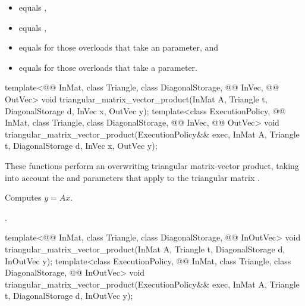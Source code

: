 \pnum
\expects
\begin{itemize}
\item
{} equals ,
\item
{} equals ,
\item
{} equals  for those overloads that take an  parameter, and
\item
{} equals  for those overloads that take a  parameter.
\end{itemize}

\begin{itemdecl}
template<@@ InMat, class Triangle, class DiagonalStorage, @@ InVec,
         @@ OutVec>
  void triangular_matrix_vector_product(InMat A, Triangle t, DiagonalStorage d, InVec x, OutVec y);
template<class ExecutionPolicy,
         @@ InMat, class Triangle, class DiagonalStorage, @@ InVec,
         @@ OutVec>
  void triangular_matrix_vector_product(ExecutionPolicy&& exec,
                                        InMat A, Triangle t, DiagonalStorage d, InVec x, OutVec y);
\end{itemdecl}

\begin{itemdescr}

\pnum
These functions perform
an overwriting triangular matrix-vector product,
taking into account the  and  parameters
that apply to the triangular matrix .

\pnum
\effects
Computes $y = A x$.

\pnum
\complexity
{}.
\end{itemdescr}

\begin{itemdecl}
template<@@ InMat, class Triangle, class DiagonalStorage, @@ InOutVec>
  void triangular_matrix_vector_product(InMat A, Triangle t, DiagonalStorage d, InOutVec y);
template<class ExecutionPolicy,
         @@ InMat, class Triangle, class DiagonalStorage, @@ InOutVec>
  void triangular_matrix_vector_product(ExecutionPolicy&& exec,
                                        InMat A, Triangle t, DiagonalStorage d, InOutVec y);
\end{itemdecl}

